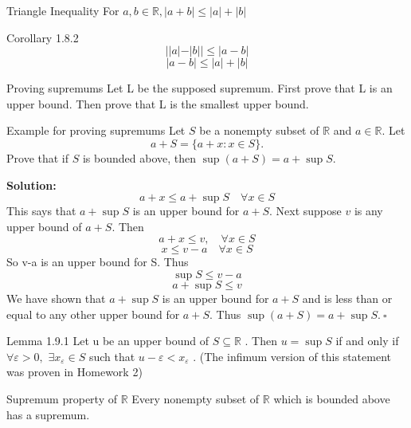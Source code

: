 \documentclass[10pt,landscape]{article}
\theoremstyle{definition}
\newcommand{\thistheoremname}{}
\newtheorem*{genericthm*}{\thistheoremname}
\newenvironment{namedthm*}[1]
{\renewcommand{\thistheoremname}{#1}\begin{genericthm*}}
{\end{genericthm*}}
\begin{document}
\begin{multicols}{3}
\begin{namedthm*}{Triangle Inequality}
  For $a, b \in \mathbb{R},|a+b| \leq|a|+|b|$
\end{namedthm*}

\begin{namedthm*}{Corollary 1.8.2}
   $$| | a|-| b| | \leq|a-b|$$
  $$|a-b| \leq|a|+|b|$$
\end{namedthm*}

\begin{namedthm*}{Proving supremums}
     Let L be the supposed supremum. First prove that L is an upper bound. Then prove that L is the smallest upper bound.
\end{namedthm*}

\begin{namedthm*}{Example for proving supremums}
   Let $S$ be a nonempty subset of $\mathbb{R}$ and $a \in \mathbb{R} .$ Let
$$
a+S=\{a+x : x \in S\}.
$$
Prove that if $S$ is bounded above, then $\sup (a+S)=a+\sup S$.

\textbf{Solution:}
\begin{equation}
a+x \leq a+\sup S \quad \forall x \in S
\end{equation}
This says that $a+\sup S$ is an upper bound for $a+S$. Next suppose $v$ is any upper bound of $a+S .$ Then
\begin{equation}
a+x \leq v, \quad \forall x \in S
\end{equation}
\begin{equation}
x \leq v-a \quad \forall x \in S
\end{equation}
So v-a is an upper bound for S. Thus
\begin{equation}
\sup S \leq v-a
\end{equation}
\begin{equation}
a+\sup S \leq v
\end{equation}
We have shown that $a+\sup S$ is an upper bound for $a+S$ and is less than or equal to any other
upper bound for $a+S .$ Thus $\sup (a+S)=a+\sup S .~ \square$
\end{namedthm*}

\begin{namedthm*}{Lemma 1.9.1}
 Let u be an upper bound of $S \subseteq \mathbb{R}$ . Then $u=\sup S$ if and only if $\forall \varepsilon>0,$
$\exists x_{\varepsilon} \in S$ such that $u-\varepsilon<x_{\varepsilon}$ . (The infimum version of this statement was proven in Homework 2)
\end{namedthm*}

\begin{namedthm*}{Supremum property of $\mathbb{R}$}
  Every nonempty subset of $\mathbb{R}$ which is bounded above has a supremum.
\end{namedthm*}


\end{multicols}
\end{document}
